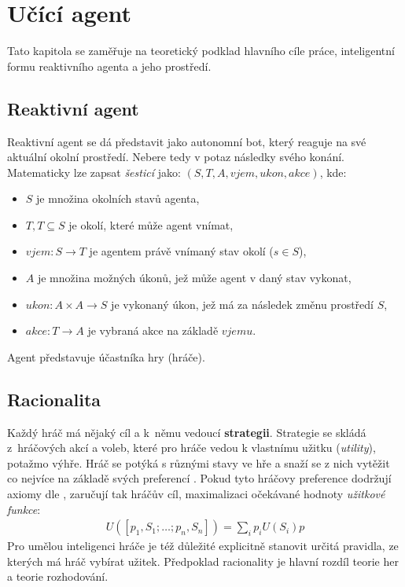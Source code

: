\chapter{Učící agent}
\label{teorie:uciciagent}
Tato kapitola se zaměřuje na teoretický podklad hlavního cíle práce, inteligentní formu reaktivního agenta \cite{AI3} a jeho prostředí.
\section{Reaktivní agent}
Reaktivní agent \cite{AI3} se dá představit jako autonomní bot, který reaguje na své aktuální okolní prostředí. Nebere tedy v potaz následky svého konání. Matematicky lze zapsat \textit{šesticí} \cite{AI3} jako: $(S, T, A, vjem, ukon, akce)$, kde:
\begin{itemize}
\item $S$ je množina okolních stavů agenta,
\item $T, T\subseteq S$ je okolí, které může agent vnímat,
\item $vjem: S \to T$ je agentem právě vnímaný stav okolí ($s \in S$),
\item $A$ je množina možných úkonů, jež může agent v daný stav vykonat,
\item $ukon: A \times A \to S$ je vykonaný úkon, jež má za následek změnu prostředí $S$,
\item $akce: T \to A$ je vybraná akce na základě $vjemu$.
\end{itemize}
Agent představuje účastníka hry (hráče).

\section{Racionalita}
\label{sec:racionalita}
Každý hráč má nějaký cíl a k němu vedoucí \textbf{strategii}. Strategie se skládá z hráčových akcí a voleb, které pro hráče vedou k vlastnímu užitku (\textit{utility}), potažmo výhře. Hráč se potýká s různými stavy ve hře a snaží se z nich vytěžit co nejvíce na základě svých preferencí \cite{berkeley}. Pokud tyto hráčovy preference dodržují axiomy dle \cite{mas}, zaručují tak hráčův cíl, maximalizaci očekávané hodnoty \textit{užitkové funkce}:
\begin{align}
U([p_1,S_1;\dots;p_n,S_n]) = \sum_{i}p_iU(S_i)p
\end{align}
Pro umělou inteligenci hráče je též důležité explicitně stanovit určitá pravidla, ze kterých má hráč vybírat užitek. Předpoklad racionality je hlavní rozdíl teorie her a teorie rozhodování.

